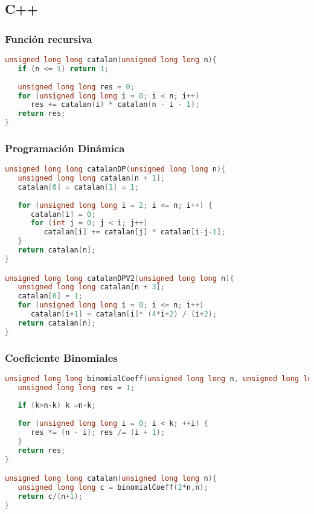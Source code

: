 

\subsection{C++}

\subsubsection{Función recursiva}
\begin{lstlisting}[language=C++]
unsigned long long catalan(unsigned long long n){
   if (n <= 1) return 1;
	
   unsigned long long res = 0;
   for (unsigned long long i = 0; i < n; i++)
      res += catalan(i) * catalan(n - i - 1);
   return res;
}
\end{lstlisting}

\subsubsection{Programación Dinámica}
\begin{lstlisting}[language=C++]
unsigned long long catalanDP(unsigned long long n){
   unsigned long long catalan[n + 1];
   catalan[0] = catalan[1] = 1;
   
   for (unsigned long long i = 2; i <= n; i++) {
      catalan[i] = 0;
      for (int j = 0; j < i; j++)
         catalan[i] += catalan[j] * catalan[i-j-1];
   }
   return catalan[n];
}

unsigned long long catalanDPV2(unsigned long long n){
   unsigned long long catalan[n + 3];
   catalan[0] = 1;
   for (unsigned long long i = 0; i <= n; i++)
      catalan[i+1] = catalan[i]* (4*i+2) / (i+2);
   return catalan[n];
}
\end{lstlisting}


\subsubsection{Coeficiente Binomiales}
\begin{lstlisting}[language=C++]
unsigned long long binomialCoeff(unsigned long long n, unsigned long long k) {
   unsigned long long res = 1;
	
   if (k>n-k) k =n-k;
	
   for (unsigned long long i = 0; i < k; ++i) {
      res *= (n - i); res /= (i + 1);
   }
   return res;
}

unsigned long long catalan(unsigned long long n){
   unsigned long long c = binomialCoeff(2*n,n);
   return c/(n+1);
}
\end{lstlisting}

